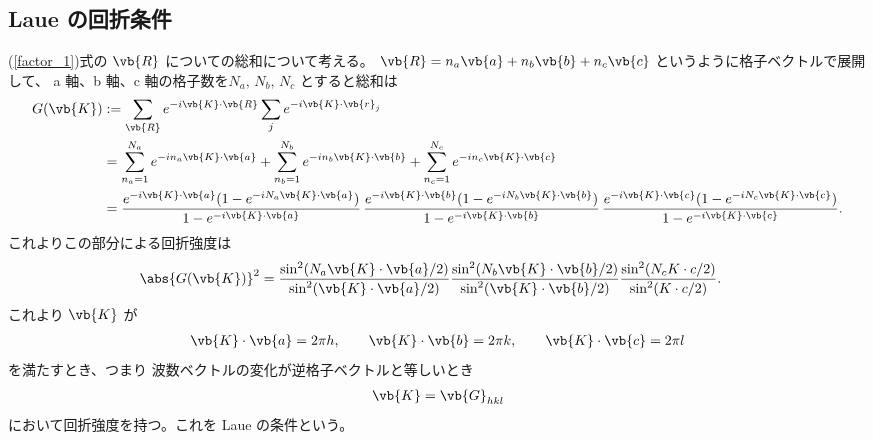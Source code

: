 \documentclass[11pt,dvipdfmx,a4paper]{jsarticle}
\begin{document}
\subsection{Laue の回折条件}
(\ref{factor_1})式の \(\vb{R}\) についての総和について考える。
\(\vb{R} = n_a \vb{a} + n_b \vb{b} + n_c \vb{c}\) というように格子ベクトルで展開して、
a 軸、b 軸、c 軸の格子数を\(N_a,\,N_b,\,N_c\) とすると総和は
\begin{align}
	G(\vb{K}) &:= \sum_{\vb{R}} e^{-i\vb{K}\cdot \vb{R}}\sum_j e^{-i\vb{K}\cdot \vb{r}_j}\\
	&= \sum_{n_a=1}^{N_a} e^{-in_a\vb{K}\cdot \vb{a}} + \sum_{n_b=1}^{N_b} e^{-in_b\vb{K}\cdot \vb{b}} + \sum_{n_c=1}^{N_c} e^{-in_c\vb{K}\cdot \vb{c}}\\
	&=\frac{e^{-i\vb{K}\cdot \vb{a}} (1-e^{-iN_a \vb{K}\cdot \vb{a}})}{1-e^{-i\vb{K}\cdot \vb{a}}}\,
	\frac{e^{-i\vb{K}\cdot \vb{b}} (1-e^{-iN_b \vb{K}\cdot \vb{b}})}{1-e^{-i\vb{K}\cdot \vb{b}}}\,
	\frac{e^{-i\vb{K}\cdot \vb{c}} (1-e^{-iN_c \vb{K}\cdot \vb{c}})}{1-e^{-i\vb{K}\cdot \vb{c}}} .
\end{align}
これよりこの部分による回折強度は
\begin{align}
	\abs{G(\vb{K})}^2 &= \dfrac{\sin^2(N_a \vb{K}\cdot \vb{a}/2)}{\sin^2(\vb{K}\cdot \vb{a}/2)}
	\dfrac{\sin^2(N_b \vb{K}\cdot \vb{b}/2)}{\sin^2(\vb{K}\cdot \vb{b}/2)}
	\dfrac{\sin^2(N_c K\cdot c/2)}{\sin^2(K\cdot c/2)} .
\end{align}
これより \(\vb{K}\) が
\begin{align}
	\vb{K}\cdot \vb{a} = 2\pi h, \qquad \vb{K}\cdot \vb{b} =2\pi k, \qquad \vb{K}\cdot \vb{c} =2\pi l
\end{align}
を満たすとき、つまり 波数ベクトルの変化が逆格子ベクトルと等しいとき
\begin{align}
	\vb{K} = \vb{G}_{hkl}
\end{align}
において回折強度を持つ。これを Laue の条件という。
\end{document}
